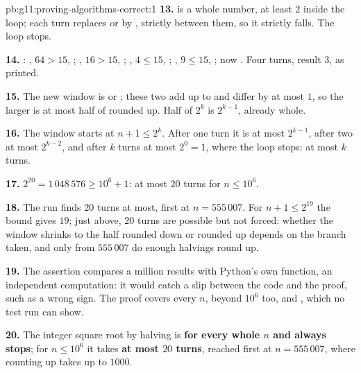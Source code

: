 \begin{solution}{pb:g11:proving-algorithms-correct:1}
\textbf{13.}  is a whole number, at least $2$ inside the loop; each turn replaces  or
 by , strictly between them, so it strictly falls. The loop stops.

\textbf{14.} : , $64 > 15$, ; , $16 > 15$, ;
, $4 \le 15$, ; , $9 \le 15$, ; now . Four turns,
result $3$, as printed.

\textbf{15.} The new window is  or ; these two add up to  and differ by at
most $1$, so the larger is at most half of  rounded up. Half of $2^k$ is $2^{k - 1}$, already whole.

\textbf{16.} The window starts at $n + 1 \le 2^k$. After one turn it is at most $2^{k - 1}$, after two at most
$2^{k - 2}$, and after $k$ turns at most $2^0 = 1$, where the loop stops: at most $k$ turns.

\textbf{17.} $2^{20} = 1\,048\,576 \ge 10^6 + 1$: at most $20$ turns for $n \le 10^6$.

\textbf{18.} The run finds $20$ turns at most, first at $n = 555\,007$. For $n + 1 \le 2^{19}$ the bound gives $19$;
just above, $20$ turns are possible but not forced: whether the window shrinks to the half rounded down or rounded up
depends on the branch taken, and only from $555\,007$ do enough halvings round up.

\textbf{19.} The assertion compares a million results with Python's own function, an independent computation: it would
catch a slip between the code and the proof, such as a wrong sign. The proof covers every $n$, beyond $10^6$ too, and
, which no test run can show.

\textbf{20.} The integer square root by halving is \textbf{ for every whole $n$ and always stops}; for
$n \le 10^6$ it takes \textbf{at most $20$ turns}, reached first at $n = 555\,007$, where counting up takes up to
$1000$.
\end{solution}
